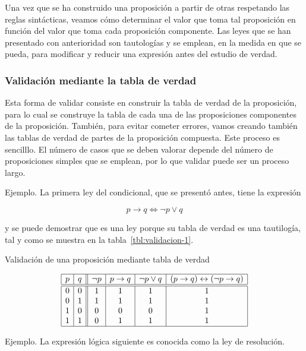 



Una vez que se ha construido una proposición a partir de otras respetando
las reglas sintácticas, veamos cómo determinar el valor que toma tal
proposición en función del valor que toma cada proposición componente. Las
leyes que se han presentado con anterioridad son tautologías y se emplean,
en la medida en que se pueda, para modificar y reducir una expresión antes
del estudio de verdad.



\subsubsection{Validación mediante la tabla de verdad}

Esta forma de validar consiste en construir la tabla de verdad de la
proposición, para lo cual se construye la tabla de cada una de las
proposiciones componentes de la proposición. También, para evitar cometer
errores, vamos creando también las tablas de verdad de partes de la
proposición compuesta. Este proceso es sencilllo. El número de casos que se
deben valorar depende del número de proposiciones simples que se emplean,
por lo que validar puede ser un proceso largo.

Ejemplo. La primera ley del condicional, que se presentó antes, tiene la
expresión

$$ p \to q \iff \neg p \lor q $$

\noindent y se puede demostrar que es una ley porque su tabla de verdad es
una tautilogía, tal y como se muestra en la tabla~\ref{tbl:validacion-1}.

\begin{table}[h]%
  \caption{Validación de una proposición mediante tabla de verdad}
  \label{tbl:validacion-1}
  \centering
  $$
    \begin{array}{|c|c||c|c|c|c|}
      \hline
      p & q & \neg p & p \to q & \neg p \lor q
        & (p \to q) \leftrightarrow (\neg p \to q) \\
      \hline
      \hline
      0 & 0 & 1 & 1 & 1 & 1 \\
      0 & 1 & 1 & 1 & 1 & 1 \\
      1 & 0 & 0 & 0 & 0 & 1 \\
      1 & 1 & 0 & 1 & 1 & 1 \\
      \hline
    \end{array}
  $$
\end{table}

Ejemplo. La expresión lógica siguiente es conocida como la ley de
resolución.

